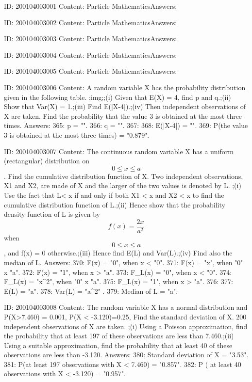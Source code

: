 \documentclass{article}
\begin{document}
ID: 200104003001
Content:
Particle MathematicsAnswers:

ID: 200104003002
Content:
Particle MathematicsAnswers:

ID: 200104003003
Content:
Particle MathematicsAnswers:

ID: 200104003004
Content:
Particle MathematicsAnswers:

ID: 200104003005
Content:
Particle MathematicsAnswers:

ID: 200104003006
Content:
A random variable X has the probability distribution given in the following table. ;img;;(i) Given that E(X) = 4, find p and q.;(ii) Show that Var(X) = 1.;(iii) Find E(|X-4|).;(iv) Then independent observations of X are taken. Find the probability that the value 3 is obtained at the most three times.  Answers:
365: p = "".
366: q = "".
367: 
368: E(|X-4|) = "".
369: P(the value 3 is obtained at the most three times) = "0.879".

ID: 200104003007
Content:
The continuous random variable X has a uniform (rectangular) distribution on $$0 \leq x \leq a$$. Find the cumulative distribution function of X. Two independent observations, X1 and X2, are made of X and the larger of the two values is denoted by L. ;(i) Use the fact that L< x if and only if both X1 < x and X2 < x to find the cumulative distribution function of L.;(ii) Hence show that the probability density function of L is given by $$f(x)=\frac{2x}{a^2}$$ when $$0 \leq x \leq a$$, and f(x) = 0 otherwise.;(iii) Hence find E(L) and Var(L).;(iv) Find also the median of L. Answers:
370: F(x) = "0", when x < "0".
371: F(x) = "x", when "0" \leq x \leq "a".
372: F(x) = "1", when x > "a".
373: F_L(x) = "0", when x < "0".
374: F_L(x) = "x^2", when "0" \leq x \leq "a".
375: F_L(x) = "1", when x > "a".
376: 
377: E(L) = "a".
378: Var(L) = "a^2" .
379: Median of L = "a".

ID: 200104003008
Content:
The random variable X has a normal distribution and P(X>7.460) = 0.001, P(X < -3.120)=0.25, Find the standard deviation of X. 200 independent observations of X are taken. ;(i) Using a Poisson approximation, find the probability that at least 197 of these observations are less than 7.460.;(ii) Using a suitable approximation, find the probability that at least 40 of these observations are less than -3.120.  Answers:
380: Standard deviation of X = "3.53".
381: P(at least 197 observations with X < 7.460) = "0.857".
382: P ( at least 40 observations with X < -3.120) = "0.957".
\end{document}
